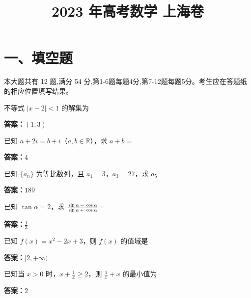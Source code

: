 ﻿\title{2023 年高考数学 上海卷}
\date{}
\maketitle

\section*{一、填空题}
本大题共有 12 题,满分 54 分,第1-6题每题4分,第7-12题每题5分。考生应在答题纸的相应位置填写结果。

\begin{question}[points=4]
不等式 $|x-2|<1$ 的解集为
\fillin[{$(1,3)$}]
\begin{solution}
\textbf{答案：}$(1,3)$
\end{solution}
\end{question}

\begin{question}[points=4]
已知 $a+2i=b+i$（$a,b\in \mathbb{R}$），求 $a+b=$
\fillin[{$4$}]
\begin{solution}
\textbf{答案：}$4$
\end{solution}
\end{question}

\begin{question}[points=4]
已知 $\{a_n\}$ 为等比数列，且 $a_1=3$，$a_3=27$，求 $a_5=$
\fillin[{$189$}]
\begin{solution}
\textbf{答案：}$189$
\end{solution}
\end{question}

\begin{question}[points=4]
已知 $\tan \alpha = 2$，求 $\frac{\sin \alpha - \cos \alpha}{\sin \alpha + \cos \alpha}=$
\fillin[{$\frac{1}{3}$}]
\begin{solution}
\textbf{答案：}$\frac{1}{3}$
\end{solution}
\end{question}

\begin{question}[points=4]
已知 $f(x)=x^2-2x+3$，则 $f(x)$ 的值域是
\fillin[{$[2,+\infty)$}]
\begin{solution}
\textbf{答案：}$[2,+\infty)$
\end{solution}
\end{question}

\begin{question}[points=4]
已知当 $x>0$ 时，$x+\frac{1}{x} \ge 2$，则 $\frac{1}{x}+x$ 的最小值为
\fillin[{$2$}]
\begin{solution}
\textbf{答案：}$2$
\end{solution}
\end{question}

